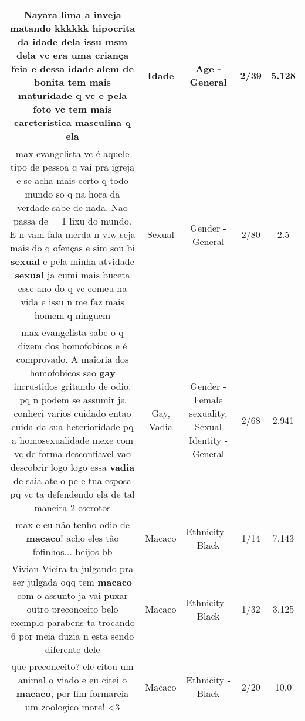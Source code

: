 \documentclass[11pt]{article}
\newlength\mylength
\begin{document}
\begin{center}
\begin{longtable}{|C{.65\mylength}|C{.30\mylength}|C{.12\mylength}|C{.12\mylength}|C{.12\mylength}|}
  \small Nayara lima a inveja matando kkkkkk hipocrita da \textbf{idade} dela issu msm dela vc era uma criança feia e dessa \textbf{idade} alem de bonita tem mais maturidade q vc e pela foto vc tem mais carcteristica masculina q ela\normalsize   & Idade & Age - General & 2/39 & 5.128 \\  \hline
  \small max evangelista vc é aquele tipo de pessoa q vai pra igreja e se acha mais certo q todo mundo so q na hora da verdade sabe de nada. Nao passa de + 1 lixu do mundo. E n vam fala merda n vlw seja mais do q ofenças e sim sou bi \textbf{sexual} e pela minha atvidade \textbf{sexual} ja cumi mais buceta esse ano do q vc comeu na vida e issu n me faz mais homem q ninguem\normalsize   & Sexual & Gender - General & 2/80 & 2.5 \\  \hline
  \small max evangelista sabe o q dizem dos homofobicos e é comprovado. A maioria dos homofobicos sao \textbf{gay} inrrustidos gritando de  odio. pq n podem se assumir ja conheci varios cuidado entao cuida da sua heterioridade pq a homosexualidade mexe com vc de forma desconfiavel vao descobrir logo logo essa \textbf{vadia} de saia ate o pe e tua esposa pq vc ta defendendo ela de tal maneira 2 escrotos\normalsize   & Gay, Vadia & Gender - Female sexuality, Sexual Identity - General & 2/68 & 2.941 \\  \hline
  \small max e eu não tenho odio de \textbf{macaco}! acho eles tão fofinhos... beijos bb\normalsize   & Macaco & Ethnicity - Black & 1/14 & 7.143 \\  \hline
  \small Vivian Vieira ta julgando pra ser julgada oqq tem \textbf{macaco} com o assunto ja vai puxar outro preconceito belo exemplo parabens ta trocando 6 por meia duzia n esta sendo diferente dele\normalsize   & Macaco & Ethnicity - Black & 1/32 & 3.125 \\  \hline
  \small que preconceito? ele citou um animal o viado e eu citei o \textbf{macaco}, por fim formareia um zoologico more! <3\normalsize   & Macaco & Ethnicity - Black & 2/20 & 10.0 \\  \hline

\end{longtable}
\end{center}
\end{document}
